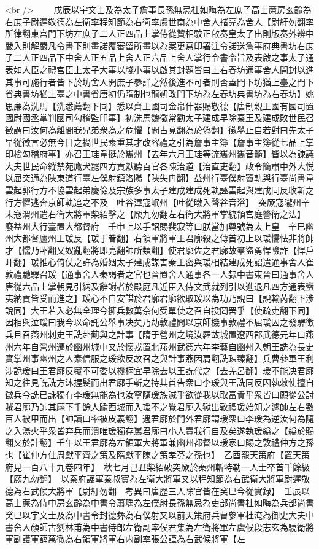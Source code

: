 <br />
　　戊辰以宇文士及為太子詹事長孫無忌杜如晦為左庶子高士亷房玄齡為右庶子尉遲敬德為左衛率程知節為右衛率虞世南為中舍人禇亮為舍人【尉紆勿翻率所律翻東宫門下坊左庶子二人正四品上掌侍從贊相駮正啟奏皇太子出則版奏外辨中嚴入則解嚴凡令書下則畫諾覆審留所畫以為案更寫印署注令諾送詹事府典書坊右庶子二人正四品下中舍人正五品上舍人正六品上舍人掌行令書令旨及表啟之事太子通表如人臣之禮宫臣上太子大事以牋小事以啟其封題皆曰上右春坊通事舍人開封以進其事可施行者皆下於坊舍人開庶子參詳之然後進不可者則否蓋門下坊猶上臺之門下省典書坊猶上臺之中書省唐初仍隋制也龍朔改門下坊為左春坊典書坊為右春坊】姚思亷為洗馬【洗悉薦翻下同】悉以齊王國司金帛什器賜敬德【唐制親王國有國司置國尉國丞掌判國司勾稽監印事】初洗馬魏徵常勸太子建成早除秦王及建成敗世民召徵謂曰汝何為離間我兄弟衆為之危懼【問古莧翻為於偽翻】徵舉止自若對曰先太子早從徵言必無今日之禍世民素重其才改容禮之引為詹事主簿【詹事主簿從七品上掌印檢勾稽府事】亦召王珪韋挺於巂州【去年六月王珪等流巂州巂音髓】皆以為諫議大夫世民命縱禁苑鷹犬罷四方貢獻聽百官各陳治道【治直吏翻】政令簡肅中外大悦以屈突通為陜東道行臺左僕射鎮洛陽【陜失冉翻】益州行臺僕射竇軌與行臺尚書韋雲起郭行方不協雲起弟慶儉及宗族多事太子建成建成死軌誣雲起與建成同反收斬之行方懼逃奔京師軌追之不及　吐谷渾寇岷州【吐從暾入聲谷音浴】　突厥寇隴州辛未寇渭州遣右衛大將軍柴紹擊之【厥九勿翻左右衛大將軍掌統領宫庭警衛之法】　廢益州大行臺置大都督府　壬申上以手詔賜裴寂等曰朕當加尊號為太上皇　辛巳幽州大都督廬州王瑗反【瑗于眷翻】右領軍將軍王君廓殺之傳首初上以瑗懦怯非將帥才【懦乃卧翻乂奴亂翻將即亮翻帥所類翻】使君廓佐之君廓故羣盜勇悍險詐【悍戶旰翻】瑗推心倚仗之許為婚姻太子建成謀害秦王密與瑗相結建成死詔遣通事舍人崔敦禮馳驛召瑗【通事舍人秦謁者之官也晉置舍人通事各一人隸中書東晉曰通事舍人唐從六品上掌朝見引納及辭謝者於殿庭凡近臣入侍文武就列引以進退凡四方通表蠻夷納貢皆受而進之】瑗心不自安謀於君廓君廓欲取瑗以為功乃說曰【說輸芮翻下涉說同】大王若入必無全理今擁兵數萬奈何受單使之召自投罔罟乎【使疏吏翻下同】因相與泣瑗曰我今以命託公舉事决矣乃劫敦禮問以京師機事敦禮不屈瑗囚之發驛徵兵且召燕州刺史王詵赴薊與之計事【隋于營州之境汝羅故城置遼西郡武德元年曰燕州六年自營州遷於幽州城中又於懷戎置北燕州武德六年李藝自幽州入朝王詵為長史實掌州事幽州之人素信服之瑗欲反故召之與計事燕因肩翻詵疎臻翻】兵曹參軍王利涉說瑗曰王君廓反覆不可委以機柄宜早除去以王詵代之【去羌呂翻】瑗不能决君廓知之往見詵詵方沐握髮而出君廓手斬之持其首告衆曰李瑗與王詵同反囚執敕使擅自徵兵今詵已誅獨有李瑗無能為也汝寧隨瑗族滅乎欲從我以取富貴乎衆皆曰願從公討賊君廓乃帥其麾下千餘人踰西城而入瑗不之覺君廓入獄出敦禮瑗始知之遽帥左右數百人被甲而出【帥讀曰率被皮義翻】遇君廓於門外君廓謂瑗衆曰李瑗為逆汝何為隨之入湯火乎衆皆弃兵而潰唯瑗獨存罵君廓曰小人賣我行自及矣遂執瑗縊之【縊於賜翻又於計翻】壬午以王君廓為左領軍大將軍兼幽州都督以瑗家口賜之敦禮仲方之孫也【崔仲方仕周獻平齊之策及隋獻平陳之策孝芬之孫也】　乙酉罷天策府【置天策府見一百八十九卷四年】　秋七月己丑柴紹破突厥於秦州斬特勒一人士卒首千餘級【厥九勿翻】　以秦府護軍秦叔寶為左衛大將軍又以程知節為右武衛大將軍尉遲敬德為右武候大將軍【尉紆勿翻　考異曰唐歷三人除官皆在癸巳今從實録】　壬辰以高士亷為侍中房玄齡為中書令蕭瑀為左僕射長孫無忌為吏部尚書杜如晦為兵部尚書癸巳以宇文士及為中書令封德彝為右僕射又以前天策府兵曹參軍杜淹為御史大夫中書舍人顔師古劉林甫為中書侍郎左衛副率侯君集為左衛將軍左虞候段志玄為驍衛將軍副護軍薛萬徹為右領軍將軍右内副率張公謹為右武候將軍【左